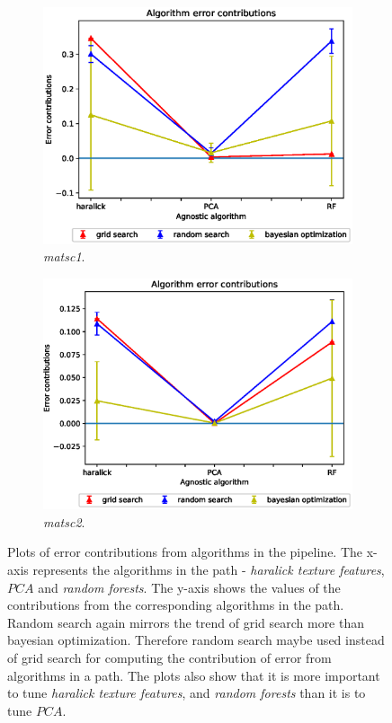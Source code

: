 \begin{figure}[ht!]
\begin{subfigure}{.5\textwidth}
\end{subfigure}
\begin{subfigure}{.5\textwidth}
  \centering
  \includegraphics[scale=0.37]{img/EP/agnostic_error_alg_matsc_dataset1.eps}
  \caption{\textit{matsc1}.}
  \label{fig:eq_alg_matsc1}
\end{subfigure}%
\begin{subfigure}{.5\textwidth}
  \centering
  \includegraphics[scale=0.37]{img/EP/agnostic_error_alg_matsc_dataset2.eps}
  \caption{\textit{matsc2}.}
  \label{fig:eq_alg_matsc2}
\end{subfigure}

\caption{Plots of error contributions from algorithms in the pipeline. The x-axis represents the algorithms in the path - \textit{haralick texture features}, $PCA$ and \textit{random forests}. The y-axis shows the values of the contributions from the corresponding algorithms in the path. Random search again mirrors the trend of grid search more than bayesian optimization. Therefore random search maybe used instead of grid search for computing the contribution of error from algorithms in a path. The plots also show that it is more important to tune \textit{haralick texture features}, and \textit{random forests} than it is to tune  $PCA$. }
\label{fig:eq_alg}
\end{figure}
